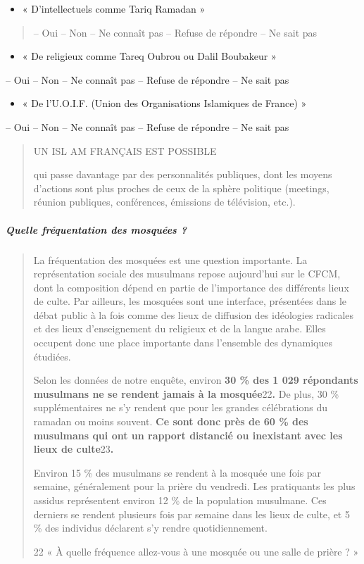 \begin{itemize}
\item
  « D'intellectuels comme Tariq Ramadan »
\end{itemize}

\begin{quote}
-- Oui -- Non -- Ne connaît pas -- Refuse de répondre -- Ne sait pas
\end{quote}

\begin{itemize}
\item
  « De religieux comme Tareq Oubrou ou Dalil Boubakeur »
\end{itemize}

-- Oui -- Non -- Ne connaît pas -- Refuse de répondre -- Ne sait pas

\begin{itemize}
\item
  « De l'U.O.I.F. (Union des Organisations Islamiques de France) »
\end{itemize}

-- Oui -- Non -- Ne connaît pas -- Refuse de répondre -- Ne sait pas

\begin{quote}
UN ISL AM FRANÇAIS EST POSSIBLE

qui passe davantage par des personnalités publiques, dont les moyens
d'actions sont plus proches de ceux de la sphère politique (meetings,
réunion publiques, conférences, émissions de télévision, etc.).
\end{quote}

\hypertarget{quelle-fruxe9quentation-des-mosquuxe9es}{%
\subparagraph{Quelle fréquentation des mosquées
?}\label{quelle-fruxe9quentation-des-mosquuxe9es}}

\begin{quote}
La fréquentation des mosquées est une question importante. La
représentation sociale des musulmans repose aujourd'hui sur le CFCM,
dont la composition dépend en partie de l'importance des différents
lieux de culte. Par ailleurs, les mosquées sont une interface,
présentées dans le débat public à la fois comme des lieux de diffusion
des idéologies radicales et des lieux d'enseignement du religieux et de
la langue arabe. Elles occupent donc une place importante dans
l'ensemble des dynamiques étudiées.

Selon les données de notre enquête, environ \textbf{30 \% des 1 029
répondants musulmans ne se rendent jamais à la mosquée}22\textbf{.} De
plus, 30 \% supplémentaires ne s'y rendent que pour les grandes
célébrations du ramadan ou moins souvent. \textbf{Ce sont donc près de
60 \% des musulmans qui ont un rapport distancié ou inexistant avec les
lieux de culte}23\textbf{.}

Environ 15 \% des musulmans se rendent à la mosquée une fois par
semaine, généralement pour la prière du vendredi. Les pratiquants les
plus assidus représentent environ 12 \% de la population musulmane. Ces
derniers se rendent plusieurs fois par semaine dans les lieux de culte,
et 5 \% des individus déclarent s'y rendre quotidiennement.

22 « À quelle fréquence allez-vous à une mosquée ou une salle de prière
? »
\end{quote}

